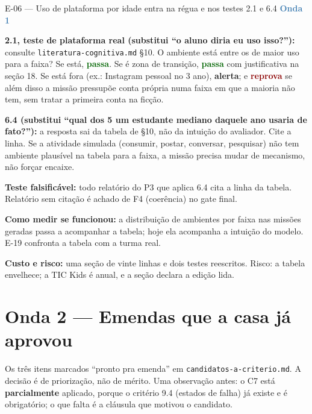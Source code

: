 \documentclass[11pt,a4paper]{article}
\newcommand{\rep}{\textcolor{DarkRed}{\textbf{reprova}}}
\newcommand{\alerta}{\textcolor{DarkYellow}{\textbf{alerta}}}
\newcommand{\passa}{\textcolor{DarkGreen}{\textbf{passa}}}
\newcommand{\onda}[1]{\textcolor{SteelBlue}{\textbf{Onda #1}}}
\begin{document}
\begin{emendabox}{E-06 --- Uso de plataforma por idade entra na régua e nos testes 2.1 e 6.4 \hfill \onda{1}}
\begin{depoisbox}\small
\textbf{2.1, teste de plataforma real (substitui ``o aluno diria eu uso isso?''):} consulte
\texttt{literatura-cognitiva.md} \S10. O ambiente está entre os de maior uso para a faixa? Se está,
\passa. Se é zona de transição, \passa{} com justificativa na seção 18. Se está fora (ex.: Instagram
pessoal no 3\textordmasculine{} ano), \alerta{}; e \rep{} se além disso a missão pressupõe conta
própria numa faixa em que a maioria não tem, sem tratar a primeira conta na ficção.

\textbf{6.4 (substitui ``qual dos 5 um estudante mediano daquele ano usaria de fato?''):} a
resposta sai da tabela de \S10, não da intuição do avaliador. Cite a linha. Se a atividade
simulada (consumir, postar, conversar, pesquisar) não tem ambiente plausível na tabela para a
faixa, a missão precisa mudar de mecanismo, não forçar encaixe.
\end{depoisbox}

\textbf{Teste falsificável:} todo relatório do P3 que aplica 6.4 cita a linha da tabela. Relatório
sem citação é achado de F4 (coerência) no gate final.

\textbf{Como medir se funcionou:} a distribuição de ambientes por faixa nas missões geradas passa
a acompanhar a tabela; hoje ela acompanha a intuição do modelo. E-19 confronta a tabela com a
turma real.

\textbf{Custo e risco:} uma seção de vinte linhas e dois testes reescritos. Risco: a tabela
envelhece; a TIC Kids é anual, e a seção declara a edição lida.
\end{emendabox}

\section{Onda 2 --- Emendas que a casa já aprovou}

Os três itens marcados ``pronto pra emenda'' em \texttt{candidatos-a-criterio.md}. A decisão é
de priorização, não de mérito. Uma observação antes: o C7 está \textbf{parcialmente} aplicado,
porque o critério 9.4 (estados de falha) já existe e é obrigatório; o que falta é a cláusula que
motivou o candidato.
\end{document}
